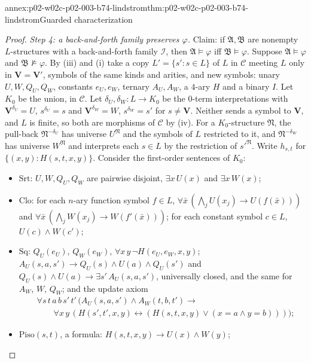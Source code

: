 \begin{annexitem}{annex:p02-w02c-p02-003-b74-lindstrom}{thm:p02-w02c-p02-003-b74-lindstrom}{Guarded characterization}
\begin{proof}
\emph{Step 4: a back-and-forth family preserves \(\varphi\).}  Claim: if
\(\mathfrak A,\mathfrak B\) are nonempty \(L\)-structures with a
back-and-forth family \(\mathcal I\), then \(\mathfrak A\models\varphi\) iff
\(\mathfrak B\models\varphi\).  Suppose \(\mathfrak A\models\varphi\) and
\(\mathfrak B\not\models\varphi\).  By (iii) and (i) take a copy
\(L'=\{s':s\in L\}\) of \(L\) in \(\mathcal C\) meeting \(L\) only in
\(\mathbf V=\mathbf V'\), symbols of the same kinds and arities, and new
symbols: unary \(U,W,Q_U,Q_W\), constants \(e_U,e_W\), ternary
\(A_U,A_W\), a \(4\)-ary \(H\) and a binary \(I\).  Let \(K_0\) be the union,
in \(\mathcal C\).  Let \(\delta_U,\delta_W:L\to K_0\) be the \(0\)-term
interpretations with \(\mathbf V^{\delta_U}=U\), \(s^{\delta_U}=s\) and
\(\mathbf V^{\delta_W}=W\), \(s^{\delta_W}=s'\) for \(s\neq\mathbf V\).
Neither sends a symbol to \(\mathbf V\), and \(L\) is finite, so both are
morphisms of \(\mathcal C\) by (iv).  For a \(K_0\)-structure \(\mathfrak
N\), the pull-back \(\mathfrak N^{-\delta_U}\) has universe \(U^{\mathfrak
N}\) and the symbols of \(L\) restricted to it, and \(\mathfrak
N^{-\delta_W}\) has universe \(W^{\mathfrak N}\) and interprets each
\(s\in L\) by the restriction of \(s'^{\mathfrak N}\).  Write \(h_{s,t}\)
for \(\{(x,y):H(s,t,x,y)\}\).  Consider the first-order sentences of
\(K_0\):
\begin{itemize}
\item \(\mathrm{Srt}\): \(U,W,Q_U,Q_W\) are pairwise disjoint,
      \(\exists x\,U(x)\) and \(\exists x\,W(x)\);
\item \(\mathrm{Clo}\): for each \(n\)-ary function symbol \(f\in L\),
      \(\forall\bar x\,(\bigwedge_jU(x_j)\to U(f(\bar x)))\) and
      \(\forall\bar x\,(\bigwedge_jW(x_j)\to W(f'(\bar x)))\); for each
      constant symbol \(c\in L\), \(U(c)\land W(c')\);
\item \(\mathrm{Sq}\): \(Q_U(e_U)\), \(Q_W(e_W)\),
      \(\forall x\,y\,\neg H(e_U,e_W,x,y)\); \(A_U(s,a,s')\to Q_U(s)\land
      U(a)\land Q_U(s')\) and \(Q_U(s)\land U(a)\to\exists
      s'\,A_U(s,a,s')\), universally closed, and the same for \(A_W\), \(W\),
      \(Q_W\); and the update axiom
      \[
      \begin{aligned}
       &\forall s\,t\,a\,b\,s'\,t'\,\bigl(A_U(s,a,s')\land A_W(t,b,t')\to{}\\
       &\qquad\forall x\,y\,(H(s',t',x,y)\leftrightarrow(H(s,t,x,y)\lor(x=a\land
       y=b)))\bigr);
      \end{aligned}
      \]
\item \(\mathrm{Piso}(s,t)\), a formula: \(H(s,t,x,y)\to U(x)\land W(y)\);

\end{itemize}
\end{proof}
\end{annexitem}
